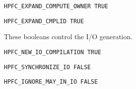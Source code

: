 \begin{verbatim}
HPFC_EXPAND_COMPUTE_OWNER TRUE
\end{verbatim}

\begin{verbatim}
HPFC_EXPAND_CMPLID TRUE
\end{verbatim}

  These booleans control the I/O generation.

\begin{verbatim}
HPFC_NEW_IO_COMPILATION TRUE
\end{verbatim}

\begin{verbatim}
HPFC_SYNCHRONIZE_IO FALSE
\end{verbatim}

\begin{verbatim}
HPFC_IGNORE_MAY_IN_IO FALSE
\end{verbatim}





